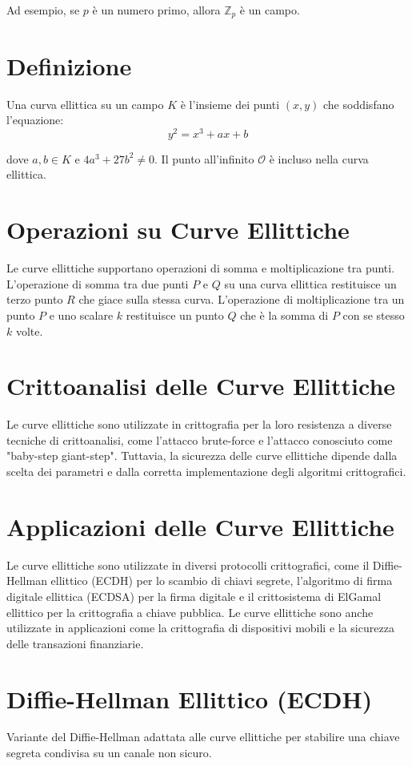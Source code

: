 \documentclass[a4paper,12pt]{report}
\begin{document}
Ad esempio, se \( p \) è un numero primo, allora \( \mathbb{Z}_p\) è un campo.

\section{Definizione}
Una curva ellittica su un campo $K$ è l'insieme dei punti $(x, y)$ che soddisfano l'equazione:
\[y^2 = x^3 + ax + b\]

dove $a, b \in K$ e $4a^3 + 27b^2 \neq 0$. Il punto all'infinito $\mathcal{O}$ è incluso nella curva ellittica.

\section{Operazioni su Curve Ellittiche}
Le curve ellittiche supportano operazioni di somma e moltiplicazione tra punti. L'operazione di somma tra due punti $P$ e $Q$ su una curva ellittica restituisce un terzo punto $R$ che giace sulla stessa curva. L'operazione di moltiplicazione tra un punto $P$ e uno scalare $k$ restituisce un punto $Q$ che è la somma di $P$ con se stesso $k$ volte.

\section{Crittoanalisi delle Curve Ellittiche}
Le curve ellittiche sono utilizzate in crittografia per la loro resistenza a diverse tecniche di crittoanalisi, come l'attacco brute-force e l'attacco conosciuto come "baby-step giant-step". Tuttavia, la sicurezza delle curve ellittiche dipende dalla scelta dei parametri e dalla corretta implementazione degli algoritmi crittografici.

\section{Applicazioni delle Curve Ellittiche}
Le curve ellittiche sono utilizzate in diversi protocolli crittografici, come il Diffie-Hellman ellittico (ECDH) per lo scambio di chiavi segrete, l'algoritmo di firma digitale ellittica (ECDSA) per la firma digitale e il crittosistema di ElGamal ellittico per la crittografia a chiave pubblica. Le curve ellittiche sono anche utilizzate in applicazioni come la crittografia di dispositivi mobili e la sicurezza delle transazioni finanziarie.

\section{Diffie-Hellman Ellittico (ECDH)}
Variante del Diffie-Hellman adattata alle curve ellittiche per stabilire una chiave segreta condivisa su un canale non sicuro.
\end{document}
